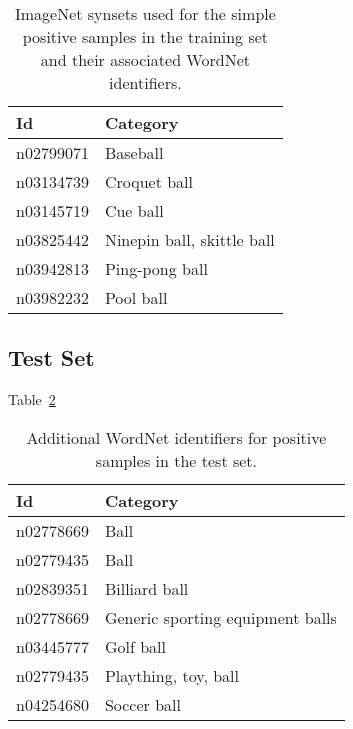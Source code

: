 \documentclass{llncs}
\begin{document}
{{			%
			\newcommand{\highlight}[1]{{#1}}
			\begin{table}
				\centering
				\caption{ImageNet synsets used for the simple positive samples in the training set and their associated WordNet \citep{fellbaum1998wordnet} identifiers.}
				\label{tab:positive_samples_simple}
				\begin{tabularx}{\textwidth}{lX}
					\toprule
					\textbf{Id} & \textbf{Category} \\
					\midrule
						\highlight{n02799071} & \highlight{Baseball} \\
						\highlight{n03134739} & \highlight{Croquet ball} \\
						\highlight{n03145719} & \highlight{Cue ball} \\
						\highlight{n03825442} & \highlight{Ninepin ball, skittle ball} \\
						\highlight{n03942813} & \highlight{Ping-pong ball} \\
						\highlight{n03982232} & \highlight{Pool ball} \\
					\bottomrule
				\end{tabularx}
			\end{table}

		}

		\subsection{Test Set} {

			Table~\ref{tab:test_set}

			\begin{table}
				\centering
				\caption{Additional WordNet identifiers for positive samples in the test set.}
				\label{tab:test_set}
				\begin{tabularx}{\textwidth}{lX}
					\toprule
					\textbf{Id} & \textbf{Category} \\
					\midrule
						n02778669 & Ball \\
						n02779435 & Ball \\
						n02839351 & Billiard ball \\
						n02778669 & Generic sporting equipment balls \\
						n03445777 & Golf ball \\
						n02779435 & Plaything, toy, ball \\
						n04254680 & Soccer ball \\
					\bottomrule
				\end{tabularx}
			\end{table}

}}
\end{document}
